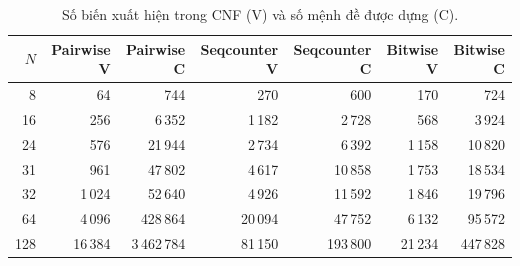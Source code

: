 \begin{table}[htbp]
\caption{Số biến xuất hiện trong CNF (V) và số mệnh đề được dựng (C).}\label{tab:cnf}
\centering\footnotesize\setlength{\tabcolsep}{5pt}
\begin{tabular}{rrrrrrr}
\toprule
$N$ & Pairwise V & Pairwise C & Seqcounter V & Seqcounter C & Bitwise V & Bitwise C \\
\midrule
8 & 64 & 744 & 270 & 600 & 170 & 724 \\
16 & 256 & 6\,352 & 1\,182 & 2\,728 & 568 & 3\,924 \\
24 & 576 & 21\,944 & 2\,734 & 6\,392 & 1\,158 & 10\,820 \\
31 & 961 & 47\,802 & 4\,617 & 10\,858 & 1\,753 & 18\,534 \\
32 & 1\,024 & 52\,640 & 4\,926 & 11\,592 & 1\,846 & 19\,796 \\
64 & 4\,096 & 428\,864 & 20\,094 & 47\,752 & 6\,132 & 95\,572 \\
128 & 16\,384 & 3\,462\,784 & 81\,150 & 193\,800 & 21\,234 & 447\,828 \\
\bottomrule
\end{tabular}
\end{table}

